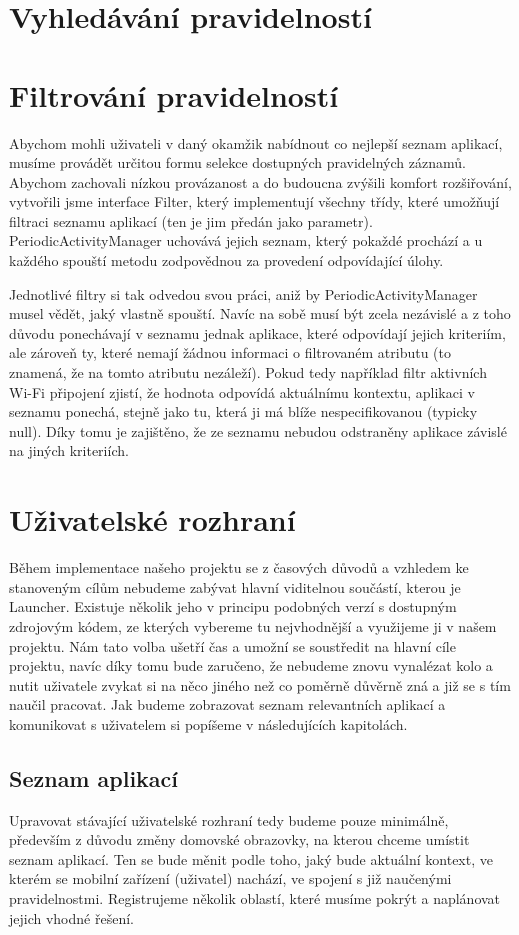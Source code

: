 \documentclass[thesis=M,czech]{FITthesis}[2012/06/26]
\begin{document}
\section{Vyhledávání pravidelností}

\section{Filtrování pravidelností}
Abychom mohli uživateli v daný okamžik nabídnout co nejlepší seznam aplikací, musíme provádět určitou formu selekce dostupných pravidelných záznamů. Abychom zachovali nízkou provázanost a do budoucna zvýšili komfort rozšiřování, vytvořili jsme interface Filter, který implementují všechny třídy, které umožňují filtraci seznamu aplikací (ten je jim předán jako parametr). PeriodicActivityManager uchovává jejich seznam, který pokaždé prochází a u každého spouští metodu zodpovědnou za provedení odpovídající úlohy.

Jednotlivé filtry si tak odvedou svou práci, aniž by PeriodicActivityManager musel vědět, jaký vlastně spouští. Navíc na sobě musí být zcela nezávislé a z toho důvodu ponechávají v seznamu jednak aplikace, které odpovídají jejich kriteriím, ale zároveň ty, které nemají žádnou informaci o filtrovaném atributu (to znamená, že na tomto atributu nezáleží). Pokud tedy například filtr aktivních Wi-Fi připojení zjistí, že hodnota odpovídá aktuálnímu kontextu, aplikaci v seznamu ponechá, stejně jako tu, která ji má blíže nespecifikovanou (typicky null). Díky tomu je zajištěno, že ze seznamu nebudou odstraněny aplikace závislé na jiných kriteriích.

\section{Uživatelské rozhraní}
Během implementace našeho projektu se z časových důvodů a vzhledem ke stanoveným cílům nebudeme zabývat hlavní viditelnou součástí, kterou je Launcher. Existuje několik jeho v principu podobných verzí s dostupným zdrojovým kódem, ze kterých vybereme tu nejvhodnější a využijeme ji v našem projektu. Nám tato volba ušetří čas a umožní se soustředit na hlavní cíle projektu, navíc díky tomu bude zaručeno, že nebudeme znovu vynalézat kolo a nutit uživatele zvykat si na něco jiného než co poměrně důvěrně zná a již se s tím naučil pracovat. Jak budeme zobrazovat seznam relevantních aplikací a komunikovat s uživatelem si popíšeme v následujících kapitolách.

\subsection{Seznam aplikací}\label{app_list}
Upravovat stávající uživatelské rozhraní tedy budeme pouze minimálně, především z důvodu změny domovské obrazovky, na kterou chceme umístit seznam aplikací. Ten se bude měnit podle toho, jaký bude aktuální kontext, ve kterém se mobilní zařízení (uživatel) nachází, ve spojení s již naučenými pravidelnostmi. Registrujeme několik oblastí, které musíme pokrýt a naplánovat jejich vhodné řešení.
\end{document}
